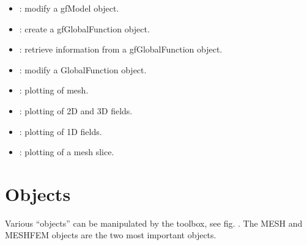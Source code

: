 \documentclass[a4paper,11pt,english]{sphinxmanual}
\begin{document}
\begin{itemize}
\item {} 
\sphinxAtStartPar
{} : modify a gfModel object.

\item {} 
\sphinxAtStartPar
{} : create a gfGlobalFunction object.

\item {} 
\sphinxAtStartPar
{} : retrieve information from a gfGlobalFunction object.

\item {} 
\sphinxAtStartPar
{} : modify a GlobalFunction object.

\item {} 
\sphinxAtStartPar
{} : plotting of mesh.

\item {} 
\sphinxAtStartPar
{} : plotting of 2D and 3D fields.

\item {} 
\sphinxAtStartPar
{} : plotting of 1D fields.

\item {} 
\sphinxAtStartPar
{} : plotting of a mesh slice.

\end{itemize}


\section{Objects}
\label{\detokenize{matlab_octave/mlabgf:objects}}
\sphinxAtStartPar
Various “objects” can be manipulated by the  toolbox, see fig.
{\hyperref[\detokenize{matlab_octave/mlabgf:malb-fig-hierarchy}]{}}. The MESH and MESHFEM objects are the two most
important objects.
\end{document}
